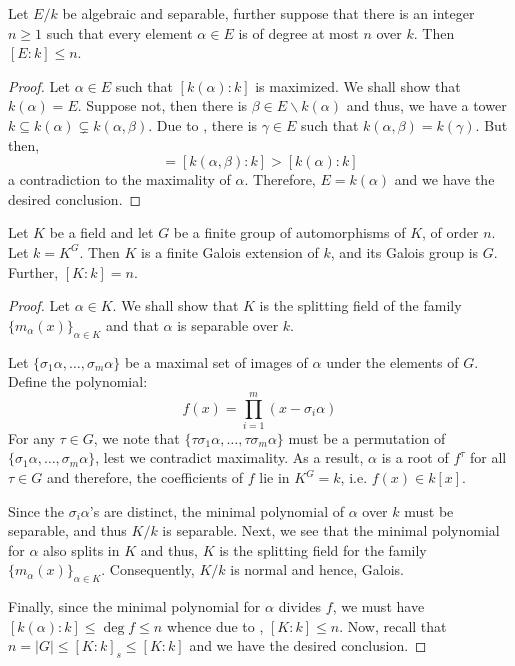 \begin{lemma}
    Let $E/k$ be algebraic and separable, further suppose that there is an integer $n\ge 1$ such that every element $\alpha\in E$ is of degree at most $n$ over $k$. Then $[E:k]\le n$.
\end{lemma}
\begin{proof}
    Let $\alpha\in E$ such that $[k(\alpha):k]$ is maximized. We shall show that $k(\alpha) = E$. Suppose not, then there is $\beta\in E\backslash k(\alpha)$ and thus, we have a tower $k\subseteq k(\alpha)\subsetneq k(\alpha,\beta)$. Due to , there is $\gamma\in E$ such that $k(\alpha,\beta) = k(\gamma)$. But then, 
    \begin{equation*}
        [k(\gamma): k] = [k(\alpha, \beta): k] > [k(\alpha):k]
    \end{equation*}
    a contradiction to the maximality of $\alpha$. Therefore, $E = k(\alpha)$ and we have the desired conclusion.
\end{proof}

\begin{theorem}[Artin]
    Let $K$ be a field and let $G$ be a finite group of automorphisms of $K$, of order $n$. Let $k = K^G$. Then $K$ is a finite Galois extension of $k$, and its Galois group is $G$. Further, $[K:k] = n$.
\end{theorem}
\begin{proof}
    Let $\alpha\in K$. We shall show that $K$ is the splitting field of the family $\{m_\alpha(x)\}_{\alpha\in K}$ and that $\alpha$ is separable over $k$. 

    Let $\{\sigma_1\alpha,\ldots,\sigma_m\alpha\}$ be a maximal set of images of $\alpha$ under the elements of $G$. Define the polynomial: 
    \begin{equation*}
        f(x) = \prod_{i = 1}^m(x - \sigma_i\alpha)
    \end{equation*}
    For any $\tau\in G$, we note that $\{\tau\sigma_1\alpha,\ldots,\tau\sigma_m\alpha\}$ must be a permutation of $\{\sigma_1\alpha,\ldots,\sigma_m\alpha\}$, lest we contradict maximality. As a result, $\alpha$ is a root of $f^\tau$ for all $\tau\in G$ and therefore, the coefficients of $f$ lie in $K^G = k$, i.e. $f(x)\in k[x]$. 

    Since the $\sigma_i\alpha$'s are distinct, the minimal polynomial of $\alpha$ over $k$ must be separable, and thus $K/k$ is separable. Next, we see that the minimal polynomial for $\alpha$ also splits in $K$ and thus, $K$ is the splitting field for the family $\{m_\alpha(x)\}_{\alpha\in K}$. Consequently, $K/k$ is normal and hence, Galois.

    Finally, since the minimal polynomial for $\alpha$ divides $f$, we must have $[k(\alpha):k]\le\deg f\le n$ whence due to , $[K:k]\le n$. Now, recall that $n = |G|\le [K:k]_s\le[K:k]$ and we have the desired conclusion.
\end{proof}

